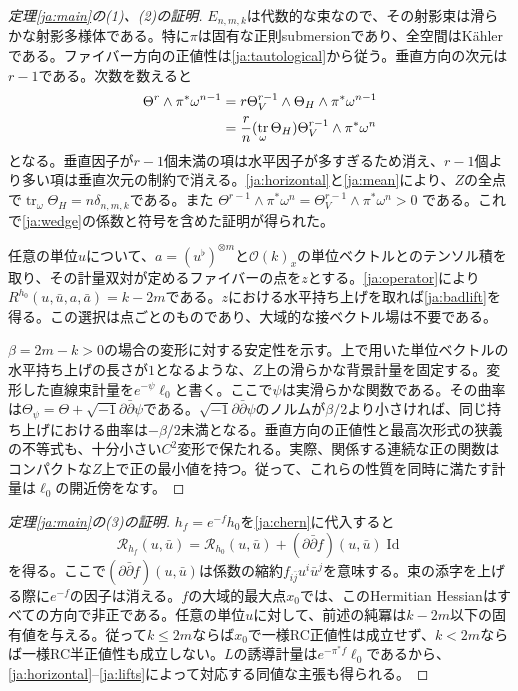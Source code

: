 \documentclass[12pt]{amsart}
\theoremstyle{definition}
\theoremstyle{remark}
\numberwithin{equation}{section}
\DeclareMathOperator{\tr}{tr}
\DeclareMathOperator{\Id}{Id}
\newcommand{\E}{E_{n,m,k}}
\newcommand{\cst}{\delta_{n,m,k}}
\newcommand{\ddc}{\sqrt{-1}\partial\bar\partial}
\newcommand{\jref}[1]{\eqref{ja:#1}}
\begin{document}
\begin{proof}[定理\ref{ja:main}の(1)、(2)の証明]
$\E$は代数的な束なので、その射影束は滑らかな射影多様体である。特に$\pi$は固有な正則submersionであり、全空間はKählerである。ファイバー方向の正値性は\jref{tautological}から従う。垂直方向の次元は$r-1$である。次数を数えると
\begin{align}
\Theta^r\wedge\pi^*\omega^{n-1}
&=r\Theta_V^{r-1}\wedge\Theta_H\wedge\pi^*\omega^{n-1}\notag\\
&=\frac rn(\tr_\omega\Theta_H)\Theta_V^{r-1}\wedge\pi^*\omega^n
\label{ja:degreecount}
\end{align}
となる。垂直因子が$r-1$個未満の項は水平因子が多すぎるため消え、$r-1$個より多い項は垂直次元の制約で消える。\jref{horizontal}と\jref{mean}により、$Z$の全点で$\tr_\omega\Theta_H=n\cst$である。また
$\Theta^{r-1}\wedge\pi^*\omega^n=\Theta_V^{r-1}\wedge\pi^*\omega^n>0$
である。これで\jref{wedge}の係数と符号を含めた証明が得られた。

任意の単位$u$について、$a=(u^\flat)^{\otimes m}$と$\mathcal O(k)_x$の単位ベクトルとのテンソル積を取り、その計量双対が定めるファイバーの点を$z$とする。\jref{operator}により$R^{h_0}(u,\bar u,a,\bar a)=k-2m$である。$z$における水平持ち上げを取れば\jref{badlift}を得る。この選択は点ごとのものであり、大域的な接ベクトル場は不要である。

$\beta=2m-k>0$の場合の変形に対する安定性を示す。上で用いた単位ベクトルの水平持ち上げの長さが$1$となるような、$Z$上の滑らかな背景計量を固定する。変形した直線束計量を$e^{-\psi}\ell_0$と書く。ここで$\psi$は実滑らかな関数である。その曲率は$\Theta_\psi=\Theta+\ddc\psi$である。$\ddc\psi$のノルムが$\beta/2$より小さければ、同じ持ち上げにおける曲率は$-\beta/2$未満となる。垂直方向の正値性と最高次形式の狭義の不等式も、十分小さい$C^2$変形で保たれる。実際、関係する連続な正の関数はコンパクトな$Z$上で正の最小値を持つ。従って、これらの性質を同時に満たす計量は$\ell_0$の開近傍をなす。
\end{proof}

\begin{proof}[定理\ref{ja:main}の(3)の証明]
$h_f=e^{-f}h_0$を\jref{chern}に代入すると
\begin{equation}\label{ja:conformal}
\mathcal R_{h_f}(u,\bar u)
=\mathcal R_{h_0}(u,\bar u)
+(\partial\bar\partial f)(u,\bar u)\Id
\end{equation}
を得る。ここで$(\partial\bar\partial f)(u,\bar u)$は係数の縮約$f_{i\bar j}u^i\bar u^j$を意味する。束の添字を上げる際に$e^{-f}$の因子は消える。$f$の大域的最大点$x_0$では、このHermitian Hessianはすべての方向で非正である。任意の単位$u$に対して、前述の純冪は$k-2m$以下の固有値を与える。従って$k\le2m$ならば$x_0$で一様RC正値性は成立せず、$k<2m$ならば一様RC半正値性も成立しない。$L$の誘導計量は$e^{-\pi^*f}\ell_0$であるから、\jref{horizontal}--\jref{lifts}によって対応する同値な主張も得られる。
\end{proof}
\end{document}
